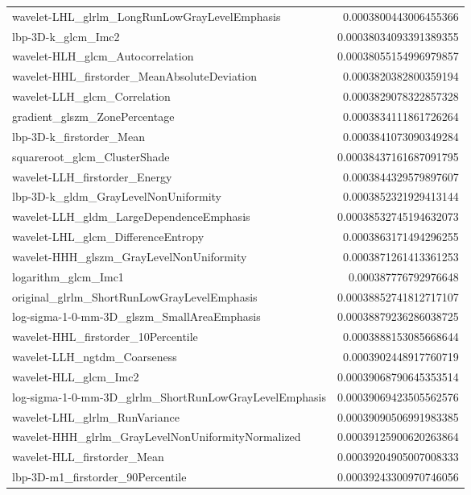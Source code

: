 {\begin{xltabular}[H]{\textwidth}{X r}
        wavelet-LHL\_glrlm\_LongRunLowGrayLevelEmphasis & 0.0003800443006455366 \\
        lbp-3D-k\_glcm\_Imc2 & 0.00038034093391389355 \\
        wavelet-HLH\_glcm\_Autocorrelation & 0.00038055154996979857 \\
        wavelet-HHL\_firstorder\_MeanAbsoluteDeviation & 0.0003820382800359194 \\
        wavelet-LLH\_glcm\_Correlation & 0.0003829078322857328 \\
        gradient\_glszm\_ZonePercentage & 0.0003834111861726264 \\
        lbp-3D-k\_firstorder\_Mean & 0.0003841073090349284 \\
        squareroot\_glcm\_ClusterShade & 0.00038437161687091795 \\
        wavelet-LLH\_firstorder\_Energy & 0.0003844329579897607 \\
        lbp-3D-k\_gldm\_GrayLevelNonUniformity & 0.0003852321929413144 \\
        wavelet-LLH\_gldm\_LargeDependenceEmphasis & 0.00038532745194632073 \\
        wavelet-LHL\_glcm\_DifferenceEntropy & 0.0003863171494296255 \\
        wavelet-HHH\_glszm\_GrayLevelNonUniformity & 0.0003871261413361253 \\
        logarithm\_glcm\_Imc1 & 0.000387776792976648 \\
        original\_glrlm\_ShortRunLowGrayLevelEmphasis & 0.00038852741812717107 \\
        log-sigma-1-0-mm-3D\_glszm\_SmallAreaEmphasis & 0.00038879236286038725 \\
        wavelet-HHL\_firstorder\_10Percentile & 0.0003888153085668644 \\
        wavelet-LLH\_ngtdm\_Coarseness & 0.0003902448917760719 \\
        wavelet-HLL\_glcm\_Imc2 & 0.00039068790645353514 \\
        log-sigma-1-0-mm-3D\_glrlm\_ShortRunLowGrayLevelEmphasis & 0.00039069423505562576 \\
        wavelet-LHL\_glrlm\_RunVariance & 0.00039090506991983385 \\
        wavelet-HHH\_glrlm\_GrayLevelNonUniformityNormalized & 0.00039125900620263864 \\
        wavelet-HLL\_firstorder\_Mean & 0.00039204905007008333 \\
        lbp-3D-m1\_firstorder\_90Percentile & 0.00039243300970746056 \\

\end{xltabular}}
